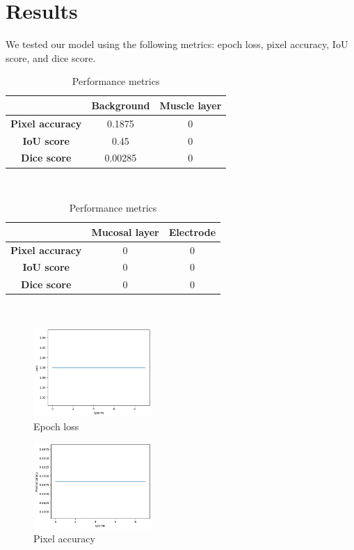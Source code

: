 \section{Results}
\label{sec:results}

We tested our model using the following metrics: epoch loss, pixel accuracy, IoU score, and dice score.

\begin{table}[htbp]
    \centering
    \caption{Performance metrics}
    \label{tab:example}
    \begin{tabular}{|c|c|c|}
        \hline
        \textbf{} & \textbf{Background} & \textbf{Muscle layer} \\
        \hline
        \textbf{Pixel accuracy} & 0.1875 & 0 \\
        \textbf{IoU score} & 0.45 & 0 \\
        \textbf{Dice score} & 0.00285 & 0 \\
        \hline
    \end{tabular} \\
    \begin{tabular}{|c|c|c|}
        \hline
        \textbf{} & \textbf{Mucosal layer} & \textbf{Electrode} \\
        \hline
        \textbf{Pixel accuracy} & 0 & 0 \\
        \textbf{IoU score} & 0 & 0 \\
        \textbf{Dice score} & 0 & 0 \\
        \hline
    \end{tabular} \\
\end{table}

\begin{figure}[!]
    \centering
    \includegraphics[width=0.4\textwidth]{Images/loss}
    \caption{Epoch loss}
    \label{fig:loss}
\end{figure}

\begin{figure}[htp!]
    \centering
    \includegraphics[width=0.4\textwidth]{Images/accuracy}
    \caption{Pixel accuracy}
    \label{fig:accuracy}
\end{figure}

